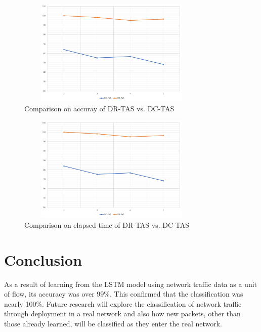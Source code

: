 \documentclass[10pt, twoside, jounal]{IEEEtran}
\begin{document}
\begin{figure}[!t]
\centering
\setlength{\abovecaptionskip}{0pt}
\setlength{\belowcaptionskip}{0pt}
{
\includegraphics[width=3.6in, height=2.0in]{fig5.jpg}
\caption{Comparison on accuray of DR-TAS vs. DC-TAS }
\label{fig5}
}
\end{figure}

\begin{figure}[!t]
\centering
\setlength{\abovecaptionskip}{0pt}
\setlength{\belowcaptionskip}{0pt}
{
\includegraphics[width=3.6in, height=2.0in]{fig6.jpg}
\caption{Comparison on elapsed time of DR-TAS vs. DC-TAS}
\label{fig6}
}
\end{figure}


\section{Conclusion}
As a result of learning from the LSTM model using network traffic data as a unit of flow, its accuracy was over 99$\%$. This confirmed that the classification was nearly 100$\%$.
Future research will explore the classification of network traffic through deployment in a real network and also how new packets, other than those already learned, will be classified as they enter the real network.
\end{document}
